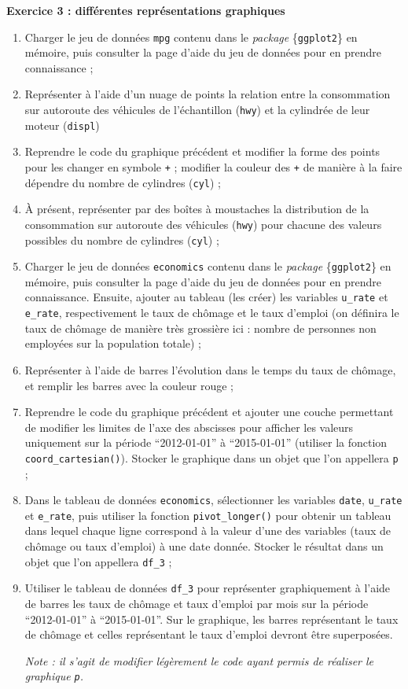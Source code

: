 \documentclass[
  11pt,
]{book}
\makeatletter
\numberwithin{equation}{section}
\numberwithin{countremarque}{section}
\newenvironment{exframe}{%
 \def\at@end@of@exframe{}%
 \ifinner\ifhmode%
  \def\at@end@of@exframe{\end{minipage}}%
  \begin{minipage}{\columnwidth}%
 \fi\fi%
 \def\FrameCommand##1{\hskip\@totalleftmargin \hskip-\fboxsep
 \colorbox{shadecolorex}{##1}\hskip-\fboxsep
     \hskip-\linewidth \hskip-\@totalleftmargin \hskip\columnwidth}%
 \MakeFramed {\advance\hsize-\width
   \@totalleftmargin\z@ \linewidth\hsize
   \@setminipage}}%
 {\par\unskip\endMakeFramed%
 \at@end@of@exframe}
\makeatother
\begin{document}
\begin{exframe}
\textbf{Exercice 3 : différentes représentations graphiques}

\begin{enumerate}
\def\labelenumi{\arabic{enumi}.}
\item
  Charger le jeu de données \texttt{mpg} contenu dans le \emph{package} \{\texttt{ggplot2}\} en mémoire, puis consulter la page d'aide du jeu de données pour en prendre connaissance ;
\item
  Représenter à l'aide d'un nuage de points la relation entre la consommation sur autoroute des véhicules de l'échantillon (\texttt{hwy}) et la cylindrée de leur moteur (\texttt{displ})
\item
  Reprendre le code du graphique précédent et modifier la forme des points pour les changer en symbole \texttt{+} ; modifier la couleur des \texttt{+} de manière à la faire dépendre du nombre de cylindres (\texttt{cyl}) ;
\item
  À présent, représenter par des boîtes à moustaches la distribution de la consommation sur autoroute des véhicules (\texttt{hwy}) pour chacune des valeurs possibles du nombre de cylindres (\texttt{cyl}) ;
\item
  Charger le jeu de données \texttt{economics} contenu dans le \emph{package} \{\texttt{ggplot2}\} en mémoire, puis consulter la page d'aide du jeu de données pour en prendre connaissance. Ensuite, ajouter au tableau (les créer) les variables \texttt{u\_rate} et \texttt{e\_rate}, respectivement le taux de chômage et le taux d'emploi (on définira le taux de chômage de manière très grossière ici : nombre de personnes non employées sur la population totale) ;
\item
  Représenter à l'aide de barres l'évolution dans le temps du taux de chômage, et remplir les barres avec la couleur rouge ;
\item
  Reprendre le code du graphique précédent et ajouter une couche permettant de modifier les limites de l'axe des abscisses pour afficher les valeurs uniquement sur la période ``2012-01-01'' à ``2015-01-01'' (utiliser la fonction \texttt{coord\_cartesian()}). Stocker le graphique dans un objet que l'on appellera \texttt{p} ;
\item
  Dans le tableau de données \texttt{economics}, sélectionner les variables \texttt{date}, \texttt{u\_rate} et \texttt{e\_rate}, puis utiliser la fonction \texttt{pivot\_longer()} pour obtenir un tableau dans lequel chaque ligne correspond à la valeur d'une des variables (taux de chômage ou taux d'emploi) à une date donnée. Stocker le résultat dans un objet que l'on appellera \texttt{df\_3} ;
\item
  Utiliser le tableau de données \texttt{df\_3} pour représenter graphiquement à l'aide de barres les taux de chômage et taux d'emploi par mois sur la période ``2012-01-01'' à ``2015-01-01''. Sur le graphique, les barres représentant le taux de chômage et celles représentant le taux d'emploi devront être superposées.

  \emph{Note : il s'agit de modifier légèrement le code ayant permis de réaliser le graphique \texttt{p}.}
\end{enumerate}
\end{exframe}
\end{document}
